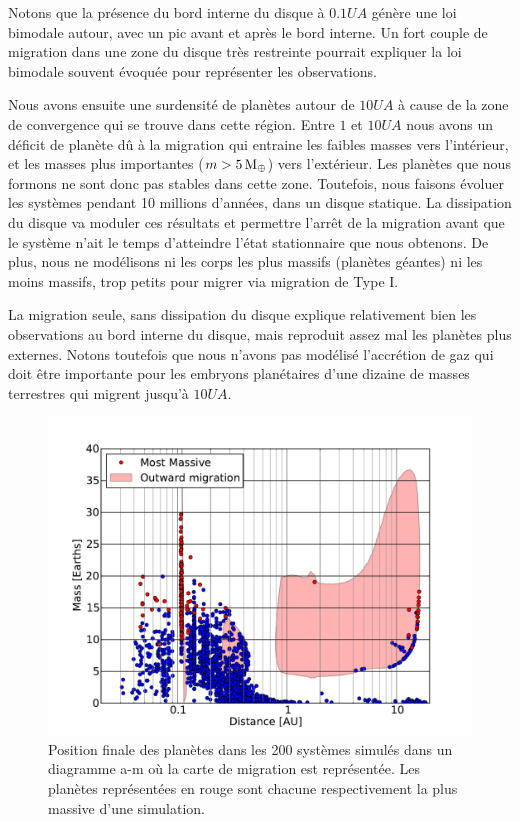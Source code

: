 Notons que la présence du bord interne du disque à $0.1\unit{UA}$ génère une loi bimodale autour, avec un pic avant et après le
bord interne. Un fort couple de migration dans une zone du disque très restreinte pourrait expliquer la loi bimodale souvent
évoquée pour représenter les observations. 

Nous avons ensuite une surdensité de planètes autour de $10\unit{UA}$ à cause de la zone de convergence qui se trouve dans
cette région. Entre $1$ et $10\unit{UA}$ nous avons un déficit de planète dû à la migration qui entraine les faibles masses vers
l'intérieur, et les masses plus importantes ($m>5\mathrm{\thinspace M_\oplus}$) vers l'extérieur. Les planètes que nous formons ne sont donc pas
stables dans cette zone. Toutefois, nous faisons évoluer les systèmes pendant 10 millions d'années, dans un disque statique. La
dissipation du disque va moduler ces résultats et permettre l'arrêt de la migration avant que le système n'ait le temps
d'atteindre l'état stationnaire que nous obtenons. De plus, nous ne modélisons ni les corps les plus massifs (planètes géantes)
ni les moins massifs, trop petits pour migrer via migration de Type I.

La migration seule, sans dissipation du disque explique relativement bien les observations au bord interne du disque, mais reproduit assez mal les planètes plus externes. Notons toutefois que nous n'avons pas modélisé l'accrétion de gaz qui doit être importante pour les embryons planétaires d'une dizaine de masses terrestres qui migrent jusqu'à $10\unit{UA}$. 

\begin{figure}[htbp]
\centering
\includegraphics[width=0.8\linewidth]{figure/HSE/m_fct_a.pdf}
\caption[Position statistique des planètes par rapport à la carte de migration.]{Position finale des planètes dans les 200
systèmes simulés dans un diagramme a-m où la carte de migration est représentée. Les planètes représentées en rouge sont chacune
respectivement la plus massive d'une simulation.}\label{fig:HSE_fid_mfcta}
\end{figure}

